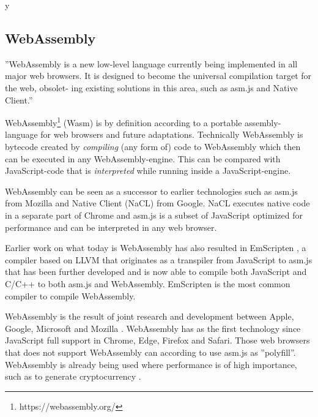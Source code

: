 y

\subsection{WebAssembly}

''WebAssembly is a new low-level language currently being implemented in all major web browsers. It is designed to become the universal compilation target for the web, obsolet- ing existing solutions in this area, such as asm.js and Native Client.'' \parencite{Watt2018}

WebAssembly\footnote{https://webassembly.org/} (Wasm) is by definition according to \textcite{HaasRossbergSchuffTitzerHolmanGohmanWagnerZakaiBastien2017} a portable assembly-language for web browsers and future adaptations. Technically WebAssembly is bytecode created by \emph{compiling} (any form of) code to WebAssembly \parencite{Watt2018} which then can be executed in any WebAssembly-engine. This can be compared with JavaScript-code that is \emph{interpreted} while running inside a JavaScript-engine.

WebAssembly can be seen as a successor to earlier technologies such as asm.js from Mozilla and Native Client (NaCL) from Google. NaCL executes native code in a separate part of Chrome and asm.js  \parencite{Zakai2018} is a subset of JavaScript optimized for performance \parencite{VanEsNicolayStievenartDHondtDeRoover2016} and can be interpreted in any web browser.

Earlier work on what today is WebAssembly has also resulted in EmScripten \parencite{Zakai2011}, a compiler based on LLVM \parencite{LattnerAdve2014} that originates as a transpiler from JavaScript to asm.js \parencite{Zakai2011} that has been further developed \parencite{HaasRossbergSchuffTitzerHolmanGohmanWagnerZakaiBastien2017} and is now able to compile both JavaScript and C/C++ to both asm.js and WebAssembly. EmScripten is the most common compiler to compile WebAssembly.

WebAssembly is the result of joint research and development between Apple, Google, Microsoft and Mozilla \parencite{HaasRossbergSchuffTitzerHolmanGohmanWagnerZakaiBastien2017}. WebAssembly has as the first technology since JavaScript full support in Chrome, Edge, Firefox and Safari. Those web browsers that does not support WebAssembly can according to \textcite{HaasRossbergSchuffTitzerHolmanGohmanWagnerZakaiBastien2017} use asm.js as ''polyfill''. WebAssembly is already being used where performance is of high importance, such as to generate cryptocurrency \parencite{RuthZimmermannWolsingHohlfeld2018}.

